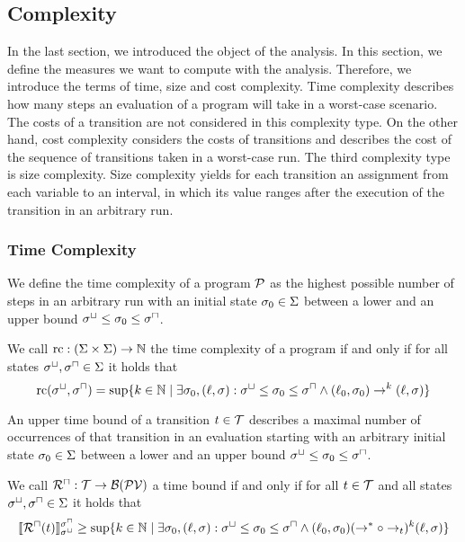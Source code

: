 \subsection{Complexity}

In the last section, we introduced the object of the analysis.
In this section, we define the measures we want to compute with the analysis.
Therefore, we introduce the terms of time, size and cost complexity.
Time complexity describes how many steps an evaluation of a program will take in a worst-case scenario.
The costs of a transition are not considered in this complexity type.
On the other hand, cost complexity considers the costs of transitions and describes the cost of the sequence of transitions taken in a worst-case run.
The third complexity type is size complexity.
Size complexity yields for each transition an assignment from each variable to an interval, in which its value ranges after the execution of the transition in an arbitrary run.

\subsubsection{Time Complexity}

We define the time complexity of a program $\mathcal{P}$ as the highest possible number of steps in an arbitrary run with an initial state $\sigma_0 \in \Sigma$ between a lower and an upper bound ${\sigma^\sqcup} \leq \sigma_0 \leq {\sigma^\sqcap}$.

\begin{definition}
  We call $\text{rc}: (\Sigma \times \Sigma) \rightarrow \mathbb{N}$ the time complexity of a program if and only if for all states ${\sigma^\sqcup}, {\sigma^\sqcap} \in \Sigma$ it holds that
  \[ \text{rc}({\sigma^\sqcup}, {\sigma^\sqcap}) = \sup \lbrace  k \in \mathbb{N} \mid \exists \sigma_0, (\ell, \sigma): {\sigma^\sqcup} \leq \sigma_0 \leq {\sigma^\sqcap} \wedge (\ell_0, \sigma_0) \rightarrow^k (\ell, \sigma)  \rbrace \]
\end{definition}

An upper time bound of a transition $t \in \mathcal{T}$ describes a maximal number of occurrences of that transition in an evaluation starting with an arbitrary initial state $\sigma_0 \in \Sigma$ between a lower and an upper bound ${\sigma^\sqcup} \leq \sigma_0 \leq {\sigma^\sqcap}$.

\begin{definition}
  We call ${\mathcal{R}^\sqcap}: \mathcal{T} \rightarrow \mathcal{B}(\mathcal{PV})$ a time bound if and only if for all $t \in \mathcal{T}$ and all states ${\sigma^\sqcup}, {\sigma^\sqcap} \in \Sigma$ it holds that
  \[ \llbracket {\mathcal{R}^\sqcap}(t) \rrbracket_{{\sigma^\sqcup}}^{{\sigma^\sqcap}} \geq \sup \lbrace  k \in \mathbb{N} \mid \exists \sigma_0, (\ell, \sigma): \sigma^\sqcup \leq \sigma_0 \leq \sigma^\sqcap \wedge (\ell_0, \sigma_0) (\rightarrow^* \circ \rightarrow_t)^k (\ell, \sigma)  \rbrace \]
\end{definition}

